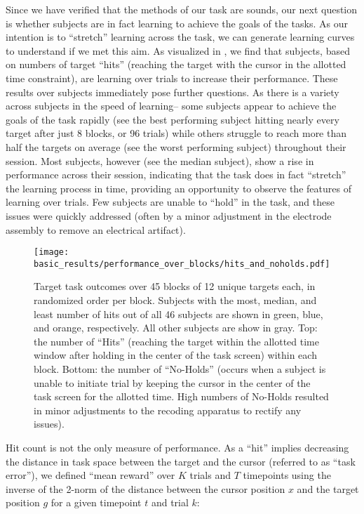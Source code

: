\documentclass[../main.tex]{subfiles}
\begin{document}
Since we have verified that the methods of our task are sounds, our next question is whether subjects are in fact learning to achieve the goals of the tasks. As our intention is to ``stretch'' learning across the task, we can generate learning curves to understand if we met this aim. As visualized in , we find that subjects, based on numbers of target ``hits'' (reaching the target with the cursor in the allotted time constraint), are learning over trials to increase their performance. These results over subjects immediately pose further questions. As there is a variety across subjects in the speed of learning-- some subjects appear to achieve the goals of the task rapidly (see the best performing subject hitting nearly every target after just 8 blocks, or 96 trials) while others struggle to reach more than half the targets on average (see the worst performing subject) throughout their session. Most subjects, however (see the median subject), show a rise in performance across their session, indicating that the task does in fact ``stretch'' the learning process in time, providing an opportunity to observe the features of learning over trials. Few subjects are unable to ``hold'' in the task, and these issues were quickly addressed (often by a minor adjustment in the electrode assembly to remove an electrical artifact).

\begin{figure}[!htb]%
    \centering
    \texttt{[image: basic\_results/performance\_over\_blocks/hits\_and\_noholds.pdf]}
    \caption[Hit and No-Hold counts over trials]{Target task outcomes over 45 blocks of 12 unique targets each, in randomized order per block. Subjects with the most, median, and least number of hits out of all 46 subjects are shown in green, blue, and orange, respectively. All other subjects are show in gray. Top: the number of ``Hits'' (reaching the target within the allotted time window after holding in the center of the task screen) within each block. Bottom: the number of ``No-Holds'' (occurs when a subject is unable to initiate trial by keeping the cursor in the center of the task screen for the allotted time. High numbers of No-Holds resulted in minor adjustments to the recoding apparatus to rectify any issues).}\label{fig:hits_and_noholds}
\end{figure}

Hit count is not the only measure of performance. As a ``hit'' implies decreasing the distance in task space between the target and the cursor (referred to as ``task error''), we defined ``mean reward'' over $K$ trials and $T$ timepoints using the inverse of the 2-norm of the distance between the cursor position $x$ and the target position $g$ for a given timepoint $t$ and trial $k$:
\end{document}
